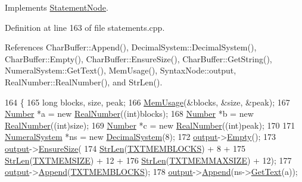 Implements \hyperlink{classStatementNode_a721589622c930c010927b9a9c55b173e}{Statement\+Node}.



Definition at line 163 of file statements.\+cpp.



References Char\+Buffer\+::\+Append(), Decimal\+System\+::\+Decimal\+System(), Char\+Buffer\+::\+Empty(), Char\+Buffer\+::\+Ensure\+Size(), Char\+Buffer\+::\+Get\+String(), Numeral\+System\+::\+Get\+Text(), Mem\+Usage(), Syntax\+Node\+::output, Real\+Number\+::\+Real\+Number(), and Str\+Len().


\begin{DoxyCode}
164 \{
165     \textcolor{keywordtype}{long} blocks, size, peak;
166     \hyperlink{mem_8h_ab6e9c298bac20e9c2638ecd520e1fb5f}{MemUsage}(&blocks, &size, &peak);
167     \hyperlink{structNumber}{Number} *a = \textcolor{keyword}{new} \hyperlink{structRealNumber}{RealNumber}((\textcolor{keywordtype}{int})blocks);
168     \hyperlink{structNumber}{Number} *b = \textcolor{keyword}{new} \hyperlink{structRealNumber}{RealNumber}((\textcolor{keywordtype}{int})size);
169     \hyperlink{structNumber}{Number} *c = \textcolor{keyword}{new} \hyperlink{structRealNumber}{RealNumber}((\textcolor{keywordtype}{int})peak);
170 
171     \hyperlink{classNumeralSystem}{NumeralSystem} *ns = \textcolor{keyword}{new} \hyperlink{classDecimalSystem}{DecimalSystem}(8);
172     \hyperlink{classSyntaxNode_a1180628cbe3fce43930cee0df5a9ce5c}{output}->\hyperlink{classCharBuffer_abe39d3fd7d8b9c8ec343af2cae7adc96}{Empty}();
173     \hyperlink{classSyntaxNode_a1180628cbe3fce43930cee0df5a9ce5c}{output}->\hyperlink{classCharBuffer_ad1907009b5ad136692b989fa96bf2f7e}{EnsureSize}(
174         \hyperlink{clib_8h_a67ec56eb98b49515d35005a5b3bf9a32}{StrLen}(\hyperlink{text_8h_abcd31bd5669011b77ecbea62103eebfd}{TXTMEMBLOCKS}) + 8 +
175         \hyperlink{clib_8h_a67ec56eb98b49515d35005a5b3bf9a32}{StrLen}(\hyperlink{text_8h_a6664fc01484a43ab07ff5c7ec761a637}{TXTMEMSIZE}) + 12 +
176         \hyperlink{clib_8h_a67ec56eb98b49515d35005a5b3bf9a32}{StrLen}(\hyperlink{text_8h_a9351a4edb0e5a7d13b78c016e5a964c4}{TXTMEMMAXSIZE}) + 12);
177     \hyperlink{classSyntaxNode_a1180628cbe3fce43930cee0df5a9ce5c}{output}->\hyperlink{classCharBuffer_a045b38735f7b3007c1b98d3d7b7feafe}{Append}(\hyperlink{text_8h_abcd31bd5669011b77ecbea62103eebfd}{TXTMEMBLOCKS});
178     \hyperlink{classSyntaxNode_a1180628cbe3fce43930cee0df5a9ce5c}{output}->\hyperlink{classCharBuffer_a045b38735f7b3007c1b98d3d7b7feafe}{Append}(ns->\hyperlink{classNumeralSystem_a74dc91c4dbab4a88a123b2a32753f485}{GetText}(a));

\end{DoxyCode}
